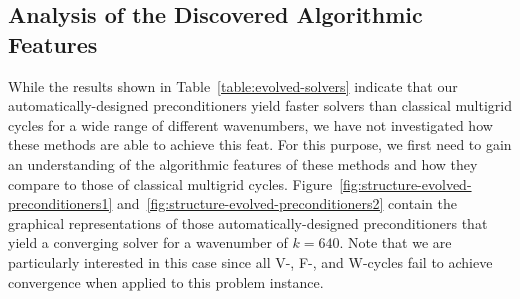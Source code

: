 \subsection{Analysis of the Discovered Algorithmic Features}
While the results shown in Table~\ref{table:evolved-solvers} indicate that our automatically-designed preconditioners yield faster solvers than classical multigrid cycles for a wide range of different wavenumbers, we have not investigated how these methods are able to achieve this feat.
For this purpose, we first need to gain an understanding of the algorithmic features of these methods and how they compare to those of classical multigrid cycles.
Figure~\ref{fig:structure-evolved-preconditioners1} and~\ref{fig:structure-evolved-preconditioners2} contain the graphical representations of those automatically-designed preconditioners that yield a converging solver for a wavenumber of $k = 640$.
Note that we are particularly interested in this case since all V-, F-, and W-cycles fail to achieve convergence when applied to this problem instance.
